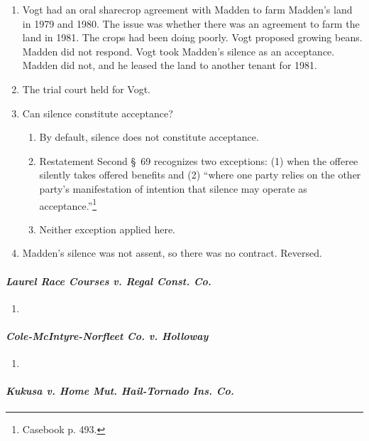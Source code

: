 \begin{enumerate}
    \item Vogt had an oral sharecrop agreement with Madden to farm Madden's 
    land in 1979 and 1980. The issue was whether there was an agreement to 
    farm the land in 1981. The crops had been doing poorly. Vogt proposed 
    growing beans. Madden did not respond. Vogt took Madden's silence as an 
    acceptance. Madden did not, and he leased the land to another tenant for 
    1981.
    \item The trial court held for Vogt.
    \item Can silence constitute acceptance?
    \begin{enumerate}
        \item By default, silence does not constitute acceptance.
        \item Restatement Second \S\ 69 recognizes two exceptions: (1) when 
        the offeree silently takes offered benefits and (2) ``where one party 
        relies on the other party's manifestation of intention that silence 
        may operate as acceptance.''\footnote{Casebook p. 493.}
        \item Neither exception applied here.
    \end{enumerate}
    \item Madden's silence was not assent, so there was no contract. Reversed.
\end{enumerate}

\newpage %

\paragraph{\emph{Laurel Race Courses v. Regal Const. Co.}}

\begin{enumerate}
    \item %
\end{enumerate}

\paragraph{\emph{Cole-McIntyre-Norfleet Co. v. Holloway}}

\begin{enumerate}
    \item %
\end{enumerate}

\paragraph{\emph{Kukusa v. Home Mut. Hail-Tornado Ins. Co.}}

